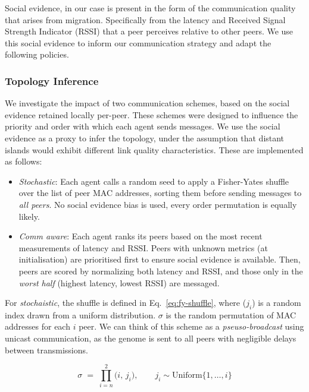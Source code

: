\documentclass[conference]{IEEEtran}
\begin{document}
Social evidence, in our case is present in the form of the communication quality that arises from migration. Specifically from the latency and Received Signal Strength Indicator (RSSI) that a peer perceives relative to other peers. We use this social evidence to inform our communication strategy and adapt the following policies. \\

\subsubsection{Topology Inference}\label{sec:topology-inference}

We investigate the impact of two communication schemes, based on the social evidence retained locally per-peer. These schemes were designed to influence the priority and order with which each agent sends messages. We use the social evidence as a proxy to infer the topology, under the assumption that distant islands would exhibit different link quality characteristics. These are implemented as follows:

\begin{itemize}
    \item \emph{Stochastic}: Each agent calls a random seed to apply a Fisher-Yates shuffle \cite{fisher_statistical_1963} over the list of peer MAC addresses, sorting them before sending messages to \emph{all peers}. No social evidence bias is used, every order permutation is equally likely.
    \item \emph{Comm aware}: Each agent ranks its peers based on the most recent measurements of latency and RSSI. Peers with unknown metrics (at initialisation) are prioritised first to ensure social evidence is available. Then, peers are scored by normalizing both latency and RSSI, and those only in the \emph{worst half} (highest latency, lowest RSSI) are messaged.
\end{itemize}

For \emph{stochaistic}, the shuffle is defined in Eq.~\ref{eq:fy-shuffle}, where ($j_i$) is a random index drawn from a uniform distribution. $\sigma$ is the random permutation of MAC addresses for each $i$ peer. We can think of this scheme as a \emph{pseuso-broadcast} using unicast communication, as the genome is sent to all peers with negligible delays between transmissions.

\begin{equation}\label{eq:fy-shuffle}
\sigma \;=\; \prod_{i=n}^{2} \bigl(i,\, j_i\bigr), 
\qquad j_i \sim \mathrm{Uniform}\{1,\dots,i\}
\end{equation}
\end{document}
